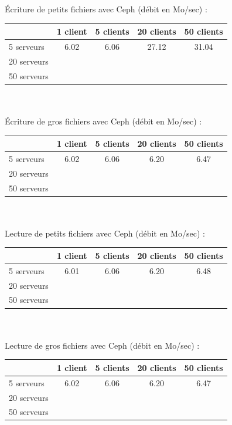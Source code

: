 \documentclass[12pt]{report}
\begin{document}
			Écriture de petits fichiers avec Ceph (débit en Mo/sec) :

			\begin{tabular}{|l|c|c|c|c|}
				\hline
				& 1 client & 5 clients & 20 clients & 50 clients \\
				\hline
				5 serveurs & 6.02 & 6.06 & 27.12 & 31.04 \\
				\hline
				20 serveurs & & & & \\
				\hline
				50 serveurs & & & & \\
				\hline
			\end{tabular}\\\\

			Écriture de gros fichiers avec Ceph (débit en Mo/sec) :

			\begin{tabular}{|l|c|c|c|c|}
				\hline
				& 1 client & 5 clients & 20 clients & 50 clients \\
				\hline
				5 serveurs & 6.02 & 6.06 & 6.20 & 6.47 \\
				\hline
				20 serveurs & & & & \\
				\hline
				50 serveurs & & & & \\
				\hline
			\end{tabular}\\\\

			Lecture de petits fichiers avec Ceph (débit en Mo/sec) :

			\begin{tabular}{|l|c|c|c|c|}
				\hline
				& 1 client & 5 clients & 20 clients & 50 clients \\
				\hline
				5 serveurs & 6.01 & 6.06 & 6.20 & 6.48 \\
				\hline
				20 serveurs & & & & \\
				\hline
				50 serveurs & & & & \\
				\hline
			\end{tabular}\\\\

			Lecture de gros fichiers avec Ceph (débit en Mo/sec) :

			\begin{tabular}{|l|c|c|c|c|}
				\hline
				& 1 client & 5 clients & 20 clients & 50 clients \\
				\hline
				5 serveurs & 6.02 & 6.06 & 6.20 & 6.47 \\
				\hline
				20 serveurs & & & & \\
				\hline
				50 serveurs & & & & \\
				\hline
			\end{tabular}
\end{document}
